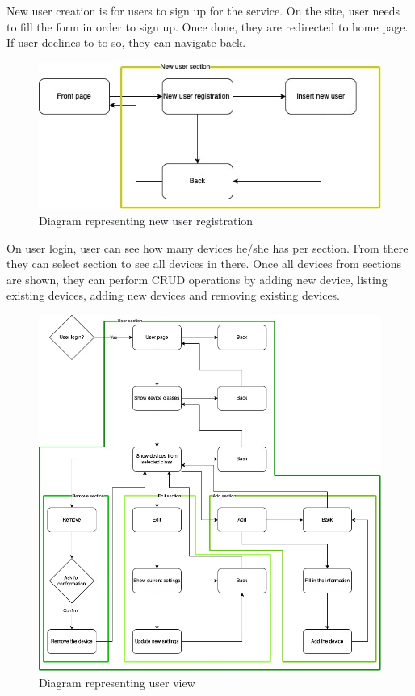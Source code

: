 New user creation is for users to sign up for the service. On the site, user needs to fill the form in order to sign up. Once done, they are redirected to home page. If user declines to to so, they can navigate back.
\begin{figure}[H]
\includegraphics[scale=0.7]{img/UI-UI-new-user.jpeg}
\centering
\caption{Diagram representing new user registration}
\end{figure}

On user login, user can see how many devices he/she has per section. From there they can select section to see all devices in there. Once all devices from sections are shown, they can perform CRUD operations by adding new device, listing existing devices, adding new devices and removing existing devices.
\begin{figure}[H]
\includegraphics[scale=0.5]{img/UI-UI-users-section.jpeg}
\centering
\caption{Diagram representing user view}
\end{figure}

